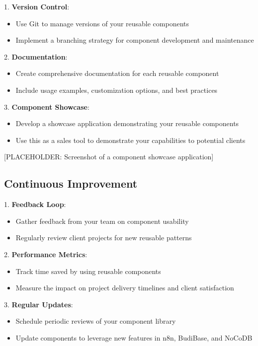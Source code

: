 1. \textbf{Version Control}:
\begin{itemize}
    \item Use Git to manage versions of your reusable components
    \item Implement a branching strategy for component development and maintenance
\end{itemize}

2. \textbf{Documentation}:
\begin{itemize}
    \item Create comprehensive documentation for each reusable component
    \item Include usage examples, customization options, and best practices
\end{itemize}

3. \textbf{Component Showcase}:
\begin{itemize}
    \item Develop a showcase application demonstrating your reusable components
    \item Use this as a sales tool to demonstrate your capabilities to potential clients
\end{itemize}

[PLACEHOLDER: Screenshot of a component showcase application]

\subsection{Continuous Improvement}

1. \textbf{Feedback Loop}:
\begin{itemize}
    \item Gather feedback from your team on component usability
    \item Regularly review client projects for new reusable patterns
\end{itemize}

2. \textbf{Performance Metrics}:
\begin{itemize}
    \item Track time saved by using reusable components
    \item Measure the impact on project delivery timelines and client satisfaction
\end{itemize}

3. \textbf{Regular Updates}:
\begin{itemize}
    \item Schedule periodic reviews of your component library
    \item Update components to leverage new features in n8n, BudiBase, and NoCoDB
\end{itemize}

